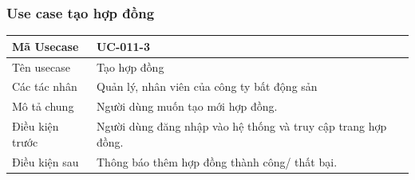 \documentclass[12pt,a4paper]{article}
\begin{document}
    \subsubsection*{Use case tạo hợp đồng}
    \begin{table}[H]
        \centering
        \begin{tabular}{|p{3.5cm}|p{11.5cm}|c|}
            \hline
            Mã Usecase      & UC-011-3                                                      \\
            \hline
            Tên usecase     & Tạo hợp đồng                                                  \\
            \hline
            Các tác nhân    & Quản lý, nhân viên của công ty bất động sản                   \\
            \hline
            Mô tả chung     & Người dùng muốn tạo mới hợp đồng.                             \\
            \hline

            Điều kiện trước & Người dùng đăng nhập vào hệ thống và truy cập trang hợp đồng. \\
            \hline

            Điều kiện sau   & Thông báo thêm hợp đồng thành công/ thất bại.                 \\
            \hline


\end{tabular}
\end{table}
\end{document}
